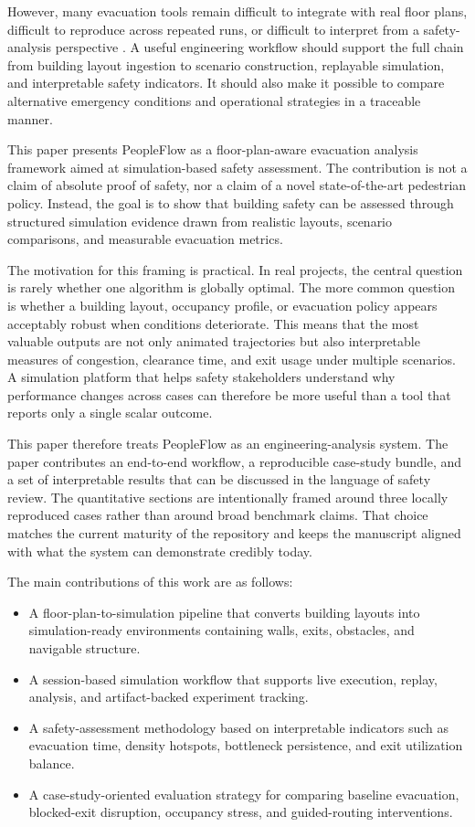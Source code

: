 \documentclass[conference]{IEEEtran}
\begin{document}
However, many evacuation tools remain difficult to integrate with real floor plans, difficult to reproduce across repeated runs, or difficult to interpret from a safety-analysis perspective \cite{path_planning,kuligowski}. A useful engineering workflow should support the full chain from building layout ingestion to scenario construction, replayable simulation, and interpretable safety indicators. It should also make it possible to compare alternative emergency conditions and operational strategies in a traceable manner.

This paper presents PeopleFlow as a floor-plan-aware evacuation analysis framework aimed at simulation-based safety assessment. The contribution is not a claim of absolute proof of safety, nor a claim of a novel state-of-the-art pedestrian policy. Instead, the goal is to show that building safety can be assessed through structured simulation evidence drawn from realistic layouts, scenario comparisons, and measurable evacuation metrics.

The motivation for this framing is practical. In real projects, the central question is rarely whether one algorithm is globally optimal. The more common question is whether a building layout, occupancy profile, or evacuation policy appears acceptably robust when conditions deteriorate. This means that the most valuable outputs are not only animated trajectories but also interpretable measures of congestion, clearance time, and exit usage under multiple scenarios. A simulation platform that helps safety stakeholders understand why performance changes across cases can therefore be more useful than a tool that reports only a single scalar outcome.

This paper therefore treats PeopleFlow as an engineering-analysis system. The paper contributes an end-to-end workflow, a reproducible case-study bundle, and a set of interpretable results that can be discussed in the language of safety review. The quantitative sections are intentionally framed around three locally reproduced cases rather than around broad benchmark claims. That choice matches the current maturity of the repository and keeps the manuscript aligned with what the system can demonstrate credibly today.

The main contributions of this work are as follows:
\begin{itemize}
    \item A floor-plan-to-simulation pipeline that converts building layouts into simulation-ready environments containing walls, exits, obstacles, and navigable structure.
    \item A session-based simulation workflow that supports live execution, replay, analysis, and artifact-backed experiment tracking.
    \item A safety-assessment methodology based on interpretable indicators such as evacuation time, density hotspots, bottleneck persistence, and exit utilization balance.
    \item A case-study-oriented evaluation strategy for comparing baseline evacuation, blocked-exit disruption, occupancy stress, and guided-routing interventions.
\end{itemize}
\end{document}
